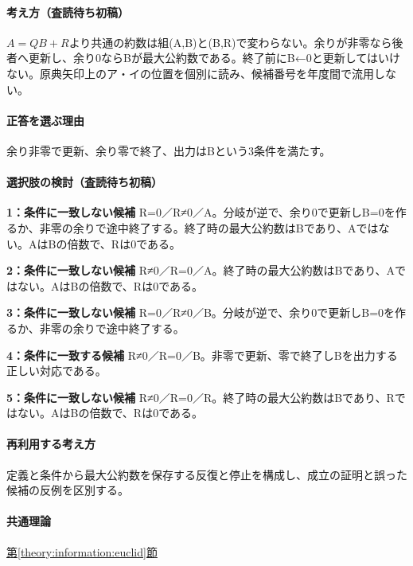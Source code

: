 \paragraph{考え方（査読待ち初稿）} \(A=QB+R\)より共通の約数は組(A,B)と(B,R)で変わらない。余りが非零なら後者へ更新し、余り0ならBが最大公約数である。終了前にB←0と更新してはいけない。原典矢印上のア・イの位置を個別に読み、候補番号を年度間で流用しない。

\paragraph{正答を選ぶ理由} 余り非零で更新、余り零で終了、出力はBという3条件を満たす。

\paragraph{選択肢の検討（査読待ち初稿）}\mbox{}\par

\noindent\textbf{1：条件に一致しない候補} R=\allowbreak{}0／R≠0／A。分岐が逆で、余り0で更新しB=\allowbreak{}0を作るか、非零の余りで途中終了する。終了時の最大公約数はBであり、Aではない。AはBの倍数で、Rは0である。\par

\noindent\textbf{2：条件に一致しない候補} R≠0／R=\allowbreak{}0／A。終了時の最大公約数はBであり、Aではない。AはBの倍数で、Rは0である。\par

\noindent\textbf{3：条件に一致しない候補} R=\allowbreak{}0／R≠0／B。分岐が逆で、余り0で更新しB=\allowbreak{}0を作るか、非零の余りで途中終了する。\par

\noindent\textbf{4：条件に一致する候補} R≠0／R=\allowbreak{}0／B。非零で更新、零で終了しBを出力する正しい対応である。\par

\noindent\textbf{5：条件に一致しない候補} R≠0／R=\allowbreak{}0／R。終了時の最大公約数はBであり、Rではない。AはBの倍数で、Rは0である。\par

\paragraph{再利用する考え方} 定義と条件から最大公約数を保存する反復と停止を構成し、成立の証明と誤った候補の反例を区別する。

\paragraph{共通理論} \hyperref[theory:information:euclid]{第\ref*{theory:information:euclid}節}

